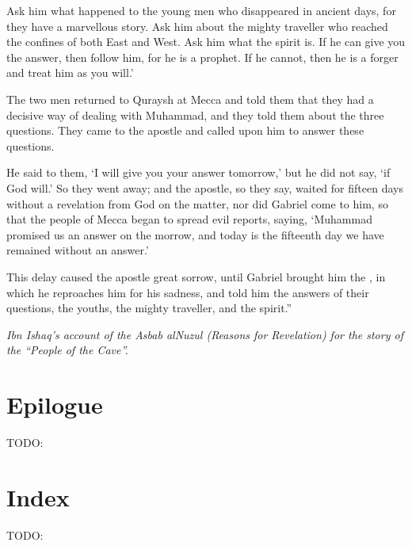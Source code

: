 \documentclass[12pt]{memoir}
\begin{document}
Ask him what happened to the young men who disappeared in ancient days,
for they have a marvellous story.
Ask him about the mighty traveller
who reached the confines of both East and West.
Ask him what the spirit is.
If he can give you the answer, then follow him, for he is a prophet.
If he cannot, then he is a forger and treat him as you will.’

The two men returned to Quraysh at Mecca and told them
that they had a decisive way of dealing with Muhammad,
and they told them about the three questions.
They came to the apostle and called upon him to answer these questions.

He said to them, ‘I will give you your answer tomorrow,’
but he did not say, ‘if God will.’
So they went away; and the apostle, so they say,
waited for fifteen days without a revelation from God on the matter,
nor did Gabriel come to him, so that the people of Mecca
began to spread evil reports, saying,
‘Muhammad promised us an answer on the morrow,
and today is the fifteenth day we have remained without an answer.’

This delay caused the apostle great sorrow,
until Gabriel brought him the ,
in which he reproaches him for his sadness,
and told him the answers of their questions, the youths,
the mighty traveller, and the spirit.”

\emph{Ibn Ishaq’s account of the Asbab al\–Nuzul
(Reasons for Revelation) for the story of the “People of the Cave”.}


\backmatter

\chapter{Epilogue}
TODO:

\chapter{Index}
TODO:
\end{document}
